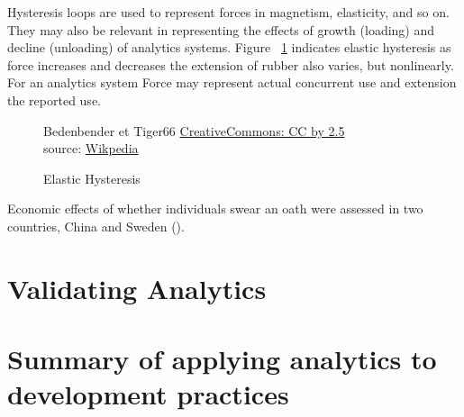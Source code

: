 Hysteresis loops are used to represent forces in magnetism, elasticity, and so on. They may also be relevant in representing the effects of growth (loading) and decline (unloading) of analytics systems. Figure ~\ref{fig:elastic-hysteresis} indicates elastic hysteresis as force increases and decreases the extension of rubber also varies, but nonlinearly. For an analytics system Force may represent actual concurrent use and extension the reported use.

\begin{figure}[!htbp]
    \centering
    \copyrightbox[r]{
        }
    {\textcopyright Bedenbender et Tiger66 \href{{https://creativecommons.org/licenses/by/2.5}}{CreativeCommons: CC by 2.5}\\source: \href{https://commons.wikimedia.org/wiki/File:Elastic_Hysteresis.svg}{Wikpedia}}
    \caption{Elastic Hysteresis}
    \label{fig:elastic-hysteresis}
\end{figure}

Economic effects of whether individuals swear an oath were assessed in two countries, China and Sweden (\cite{carlsson2013truth}). 


\section{Validating Analytics}


\section{Summary of applying analytics to development practices}

